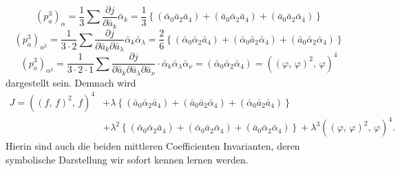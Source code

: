 \[
(p_a^3)_\alpha = \frac{1}{3}\sum\frac{\partial j}{\partial\bar a_k}\bar\alpha_k = \frac{1}{3}\left\{(\bar\alpha_0\bar a_2\bar a_4)+(\bar a_0\bar\alpha_2\bar a_4)+(\bar a_0\bar a_2\bar\alpha_4)\right\}
\]
\[
(p_a^3)_{\alpha^2} = \frac{1}{3\cdot 2}\sum\frac{\partial j}{\partial\bar a_k\partial\bar a_\lambda}\bar\alpha_k\bar\alpha_\lambda = \frac{2}{6}\left\{(\bar\alpha_0\bar\alpha_2\bar a_4)+(\bar\alpha_0\bar a_2\bar\alpha_4)+(\bar a_0\bar\alpha_2\bar\alpha_4)\right\}
\]
\[
(p_a^3)_{\alpha^3} = \frac{1}{3\cdot 2\cdot 1}\sum\frac{\partial j}{\partial\bar a_k\partial\bar a_\lambda\partial\bar a_\nu}\cdot\bar\alpha_k\bar\alpha_\lambda\bar\alpha_\nu = (\bar\alpha_0\bar\alpha_2\bar\alpha_4) = ((\varphi,\,\varphi)^2,\,\varphi)^4
\]
dargestellt sein. Demnach wird
\[
\begin{aligned}
J = ((f,\,f)^2,\,f)^4 &+ \lambda\left\{(\bar a_0\bar\alpha_2\bar a_4)+(\bar a_0\bar a_2\bar\alpha_4)+(\bar\alpha_0\bar a_2\bar a_4)\right\}\\
&+ \lambda^2\left\{(\bar\alpha_0\bar\alpha_2\bar a_4)+(\bar\alpha_0\bar a_2\bar\alpha_4)+(\bar a_0\bar\alpha_2\bar\alpha_4)\right\} + \lambda^3((\varphi,\,\varphi)^2,\,\varphi)^4.
\end{aligned}
\]
Hierin sind auch die beiden mittleren Coefficienten Invarianten, deren
symbolische Darstellung wir sofort kennen lernen werden.

